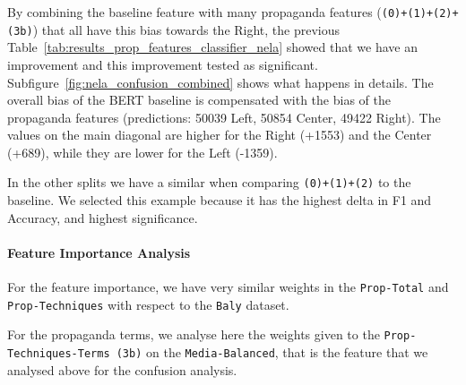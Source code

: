 By combining the baseline feature with many propaganda features (\texttt{(0)+(1)+(2)+(3b)}) that all have this bias towards the Right, the previous Table~\ref{tab:results_prop_features_classifier_nela} showed that we have an improvement and this improvement tested as significant.
Subfigure~\ref{fig:nela_confusion_combined} shows what happens in details. The overall bias of the BERT baseline is compensated with the bias of the propaganda features (predictions: 50039 Left, 50854 Center, 49422 Right).
The values on the main diagonal are higher for the Right (+1553) and the Center (+689), while they are lower for the Left (-1359).

In the other splits we have a similar when comparing \texttt{(0)+(1)+(2)} to the baseline. We selected this example because it has the highest delta in F1 and Accuracy, and highest significance. 


\paragraph{Feature Importance Analysis}

For the feature importance, we have very similar weights in the \texttt{Prop-Total} and \texttt{Prop-Techniques} with respect to the \texttt{Baly} dataset.

For the propaganda terms, we analyse here the weights given to the \texttt{Prop-Techniques-Terms (3b)} on the \texttt{Media-Balanced}, that is the feature that we analysed above for the confusion analysis.

